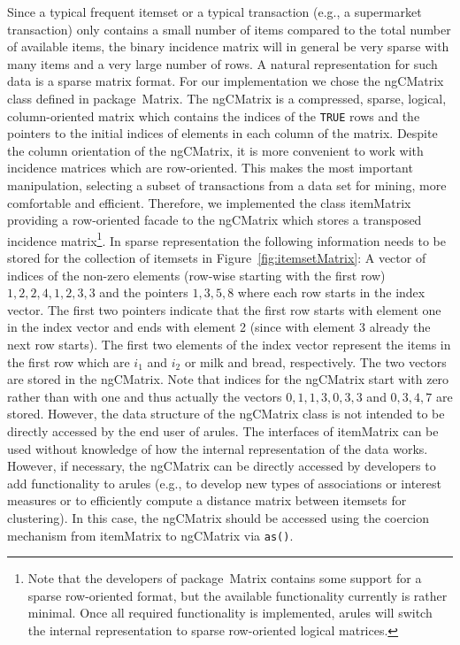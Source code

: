 \documentclass[10pt,a4paper]{article}
\newcommand{\strong}[1]{{\normalfont\fontseries{b}\selectfont #1}}
\newcommand{\class}[1]{\mbox{\textsf{#1}}}
\newcommand{\func}[1]{\mbox{\texttt{#1()}}}
\newcommand{\code}[1]{\mbox{\texttt{#1}}}
\newcommand{\pkg}[1]{\strong{#1}}
\begin{document}
Since a typical frequent itemset or a typical transaction (e.g., a
supermarket transaction) only contains a small number of items compared
to the total number of available items, the binary incidence matrix will
in general be very sparse with many items and a very large number of
rows.  A natural representation for such data is a sparse matrix format.
For our implementation we chose the \class{ngCMatrix} class defined in
package~\pkg{Matrix}.  The \class{ngCMatrix} is a compressed, sparse, logical,
column-oriented matrix which contains the indices of the \code{TRUE} rows and
the pointers to the initial indices of elements in each column of the matrix.
Despite the column orientation of the \class{ngCMatrix}, it is more convenient
to work with incidence matrices which are row-oriented.  This makes the most
important manipulation, selecting a subset of transactions from a data set for
mining, more comfortable and efficient.  Therefore, we implemented the class
\class{itemMatrix} providing a row-oriented facade to the \class{ngCMatrix}
which stores a transposed incidence matrix\footnote{Note that the developers of
package~\pkg{Matrix} contains some support for a sparse row-oriented format,
but the available functionality currently is rather minimal.  Once all required
functionality is implemented, \pkg{arules} will switch the internal
representation to sparse row-oriented logical matrices.}.  
In sparse representation the following
information needs to be stored for the collection of itemsets in
Figure~\ref{fig:itemsetMatrix}: A vector of indices of the non-zero
elements (row-wise starting with the first row) $1, 2, 2, 4, 1, 2, 3, 3$
and the pointers $1, 3, 5, 8$ where each row starts in the index vector.
The first two pointers indicate that the first row starts with element
one in the index vector and ends with element 2 (since with element 3
already the next row starts).  The first two elements of the index
vector represent the items in the first row which are $i_1$ and $i_2$ or
milk and bread, respectively.  The two vectors are stored in the
\class{ngCMatrix}. Note that indices for the \class{ngCMatrix} start
with zero rather than with one and thus actually the vectors $0, 1, 1,
3, 0, 3, 3$ and $0, 3, 4, 7$ are stored.  However, the data structure of
the \class{ngCMatrix} class is not intended to be directly accessed by
the end user of \pkg{arules}. The interfaces of \class{itemMatrix} can
be used without knowledge of how the internal representation of the data
works.  However, if necessary, the \class{ngCMatrix} can be directly
accessed by developers to add functionality to \pkg{arules} (e.g., to
develop new types of associations or interest measures or to efficiently
compute a distance matrix between itemsets for clustering).  In this
case, the \class{ngCMatrix} should be accessed using the coercion
mechanism from \class{itemMatrix} to \class{ngCMatrix} via \func{as}.
\end{document}
